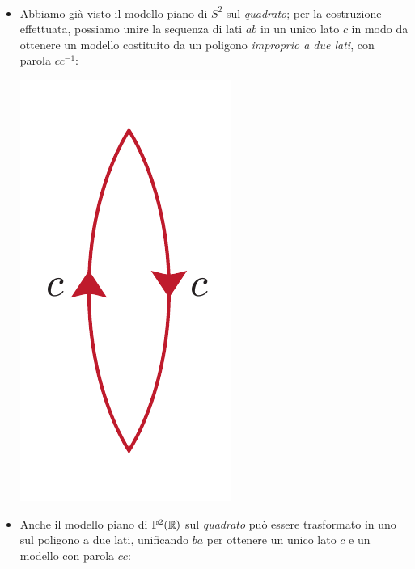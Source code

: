 \begin{examples}~{}
	\begin{itemize}
		\item Abbiamo già visto il modello piano di $S^2$ sul \textit{quadrato}; per la costruzione effettuata, possiamo unire la sequenza di lati $ab$ in un unico lato $c$ in modo da ottenere un modello costituito da un poligono \textit{improprio a due lati}, con parola $cc^{-1}$:
		\begin{center}
			\includegraphics[trim=0cm 0cm 0cm 0cm, clip, scale=0.375]{images/sphere2lines.pdf}
		\end{center}
		\item Anche il modello piano di $\mathbb{P}^2(\mathbb{R})$ sul \textit{quadrato} può essere trasformato in uno sul poligono a due lati, unificando $ba$ per ottenere un unico lato $c$ e un modello con parola $cc$:
		\begin{center}

\end{center}
\end{itemize}
\end{examples}
